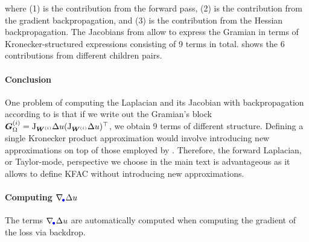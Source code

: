 where (1) is the contribution from the forward pass, (2) is the contribution from the gradient backpropagation, and (3) is the contribution from the Hessian backpropagation. The Jacobians from  allow to express the Gramian in terms of Kronecker-structured expressions consisting of 9 terms in total.  shows the 6 contributions from different children pairs.

\paragraph{Conclusion} One problem of computing the Laplacian and its Jacobian with backpropagation according to  is that if we write out the Gramian's block ${\bm{G}}_{\Omega}^{(i)} = \mathrm{J}_{{\bm{W}}^{(i)}} \Delta u (\mathrm{J}_{{\bm{W}}^{(i)}} \Delta u)^{\top}$, we obtain 9 terms of different structure.
Defining a single Kronecker product approximation would involve introducing new approximations on top of those employed by \citet{eschenhagen2023kroneckerfactored}.
Therefore, the forward Laplacian, or Taylor-mode, perspective we choose in the main text is advantageous as it allows to define KFAC without introducing new approximations.

\paragraph{Computing $\nabla_{\!{\textcolor{blue}{\bullet}}}\Delta u$}
The terms $\nabla_{\!{\textcolor{blue}{\bullet}}}\Delta u$ are automatically computed when computing the gradient of the loss via backdrop.

